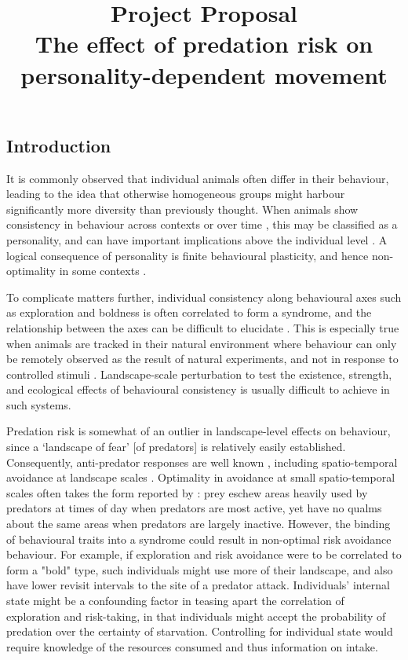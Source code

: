 \documentclass[10pt]{article}
\title{Project Proposal \\
The effect of predation risk on personality-dependent movement}
\begin{document}
\flushbottom
\maketitle

\begin{spacing}{1.15}

\linenumbers

\section{Introduction}

It is commonly observed that individual animals often differ in their behaviour, leading to the idea that otherwise homogeneous groups might harbour significantly more diversity than previously thought.
When animals show consistency in behaviour across contexts or over time \autocite{sih2004, sih2004a}, this may be classified as a personality, and can have important implications above the individual level \autocite{sih2008, sih2012}.
A logical consequence of personality is finite behavioural plasticity, and hence non-optimality in some contexts \autocite{wolf2010, wolf2012}. 

To complicate matters further, individual consistency along behavioural axes such as exploration and boldness is often correlated to form a syndrome, and the relationship between the axes can be difficult to elucidate \autocite{reale2007, carter2013}. 
This is especially true when animals are tracked in their natural environment where behaviour can only be remotely observed \autocite{cooke2004, kays2015} as the result of natural experiments, and not in response to controlled stimuli \autocite{leclerc2016}. 
Landscape-scale perturbation to test the existence, strength, and ecological effects of behavioural consistency is usually difficult to achieve in such systems. 

Predation risk is somewhat of an outlier in landscape-level effects on behaviour, since a ‘landscape of fear’ [of predators] \autocite{laundre2001} is relatively easily established. 
Consequently, anti-predator responses are well known \autocite{lima1990}, including spatio-temporal avoidance at landscape scales \autocite[e.g.][]{lank2003, ydenberg2004}. 
Optimality in avoidance at small spatio-temporal scales often takes the form reported by \cite{kohl2018}: prey eschew areas heavily used by predators at times of day when predators are most active, yet have no qualms about the same areas when predators are largely inactive. 
However, the binding of behavioural traits into a syndrome could result in non-optimal risk avoidance behaviour. For example, if exploration and risk avoidance were to be correlated to form a "bold" type, such individuals might use more of their landscape, and also have lower revisit intervals to the site of a predator attack. Individuals' internal state might be a confounding factor in teasing apart the correlation of exploration and risk-taking, in that individuals might accept the probability of predation over the certainty of starvation. Controlling for individual state would require knowledge of the resources consumed and thus information on intake.


\end{spacing}
\end{document}
